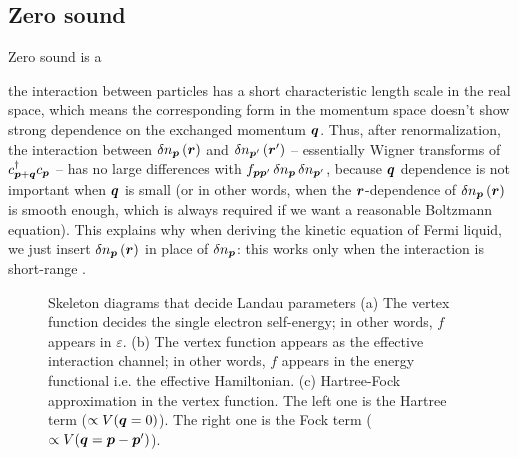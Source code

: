 \documentclass[hyperref, a4paper]{article}
\begin{document}
\subsection{Zero sound}

Zero sound is a 

the interaction between particles has 
a short characteristic length scale in the real space,
which means the corresponding form in the momentum space 
doesn't show strong dependence on the exchanged momentum $\vb*{q}$.
Thus, after renormalization, the interaction between $\var{n}_{\vb*{p}}(\vb*{r})$
and $\var{n}_{\vb*{p}'} (\vb*{r}')$
-- essentially Wigner transforms of $c^\dagger_{\vb*{p} + \vb*{q}} c_{\vb*{p}}$ --
has no large differences with 
$f_{\vb*{p} \vb*{p}'} \var{n}_{\vb*{p}} \var{n}_{\vb*{p}'}$,
because $\vb*{q}$ dependence is not important when $\vb*{q}$ is small 
(or in other words, when the $\vb*{r}$-dependence of $\var{n_{\vb*{p}}}(\vb*{r})$
is smooth enough, which is always required if we want a reasonable Boltzmann equation).
This explains why when deriving the kinetic equation of Fermi liquid, 
we just insert $\var{n}_{\vb*{p}}(\vb*{r})$ in place of $\var{n}_{\vb*{p}}$:
this works only when the interaction is short-range
\cite{pines2018theory}.

\begin{figure}
    \centering
    
    \caption{Skeleton diagrams that decide Landau parameters 
    (a) The vertex function decides the single electron self-energy; 
    in other words, $f$ appears in $\varepsilon$.
    (b) The vertex function appears as the effective interaction channel; 
    in other words, $f$ appears in the energy functional i.e. the effective Hamiltonian.
    (c) Hartree-Fock approximation in the vertex function.
    The left one is the Hartree term ($\propto V(\vb*{q} = 0)$).
    The right one is the Fock term ($\propto V(\vb*{q} = \vb*{p} - \vb*{p}')$).}
    \label{fig:hf-vertex}
\end{figure}
\end{document}
